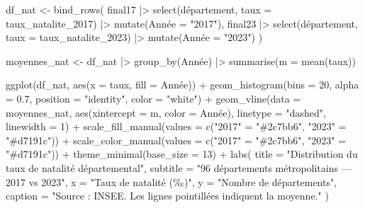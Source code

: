 \documentclass[
  letterpaper,
  DIV=11,
  numbers=noendperiod]{scrartcl}
\newenvironment{Shaded}{\begin{snugshade}}{\end{snugshade}}
\newcommand{\AttributeTok}[1]{\textcolor[rgb]{0.40,0.45,0.13}{#1}}
\newcommand{\DecValTok}[1]{\textcolor[rgb]{0.68,0.00,0.00}{#1}}
\newcommand{\FloatTok}[1]{\textcolor[rgb]{0.68,0.00,0.00}{#1}}
\newcommand{\FunctionTok}[1]{\textcolor[rgb]{0.28,0.35,0.67}{#1}}
\newcommand{\NormalTok}[1]{\textcolor[rgb]{0.00,0.23,0.31}{#1}}
\newcommand{\OtherTok}[1]{\textcolor[rgb]{0.00,0.23,0.31}{#1}}
\newcommand{\SpecialCharTok}[1]{\textcolor[rgb]{0.37,0.37,0.37}{#1}}
\newcommand{\StringTok}[1]{\textcolor[rgb]{0.13,0.47,0.30}{#1}}
\begin{document}
\begin{Shaded}
\begin{Highlighting}[]
\NormalTok{df\_nat }\OtherTok{\textless{}{-}} \FunctionTok{bind\_rows}\NormalTok{(}
\NormalTok{  final17 }\SpecialCharTok{|\textgreater{}} \FunctionTok{select}\NormalTok{(département, }\AttributeTok{taux =}\NormalTok{ taux\_natalite\_2017) }\SpecialCharTok{|\textgreater{}} \FunctionTok{mutate}\NormalTok{(Année }\OtherTok{=} \StringTok{"2017"}\NormalTok{),}
\NormalTok{  final23 }\SpecialCharTok{|\textgreater{}} \FunctionTok{select}\NormalTok{(département, }\AttributeTok{taux =}\NormalTok{ taux\_natalite\_2023) }\SpecialCharTok{|\textgreater{}} \FunctionTok{mutate}\NormalTok{(Année }\OtherTok{=} \StringTok{"2023"}\NormalTok{)}
\NormalTok{)}

\NormalTok{moyennes\_nat }\OtherTok{\textless{}{-}}\NormalTok{ df\_nat }\SpecialCharTok{|\textgreater{}} \FunctionTok{group\_by}\NormalTok{(Année) }\SpecialCharTok{|\textgreater{}} \FunctionTok{summarise}\NormalTok{(}\AttributeTok{m =} \FunctionTok{mean}\NormalTok{(taux))}

\FunctionTok{ggplot}\NormalTok{(df\_nat, }\FunctionTok{aes}\NormalTok{(}\AttributeTok{x =}\NormalTok{ taux, }\AttributeTok{fill =}\NormalTok{ Année)) }\SpecialCharTok{+}
  \FunctionTok{geom\_histogram}\NormalTok{(}\AttributeTok{bins =} \DecValTok{20}\NormalTok{, }\AttributeTok{alpha =} \FloatTok{0.7}\NormalTok{, }\AttributeTok{position =} \StringTok{"identity"}\NormalTok{, }\AttributeTok{color =} \StringTok{"white"}\NormalTok{) }\SpecialCharTok{+}
  \FunctionTok{geom\_vline}\NormalTok{(}\AttributeTok{data =}\NormalTok{ moyennes\_nat, }\FunctionTok{aes}\NormalTok{(}\AttributeTok{xintercept =}\NormalTok{ m, }\AttributeTok{color =}\NormalTok{ Année),}
             \AttributeTok{linetype =} \StringTok{"dashed"}\NormalTok{, }\AttributeTok{linewidth =} \DecValTok{1}\NormalTok{) }\SpecialCharTok{+}
  \FunctionTok{scale\_fill\_manual}\NormalTok{(}\AttributeTok{values  =} \FunctionTok{c}\NormalTok{(}\StringTok{"2017"} \OtherTok{=} \StringTok{"\#2c7bb6"}\NormalTok{, }\StringTok{"2023"} \OtherTok{=} \StringTok{"\#d7191c"}\NormalTok{)) }\SpecialCharTok{+}
  \FunctionTok{scale\_color\_manual}\NormalTok{(}\AttributeTok{values =} \FunctionTok{c}\NormalTok{(}\StringTok{"2017"} \OtherTok{=} \StringTok{"\#2c7bb6"}\NormalTok{, }\StringTok{"2023"} \OtherTok{=} \StringTok{"\#d7191c"}\NormalTok{)) }\SpecialCharTok{+}
  \FunctionTok{theme\_minimal}\NormalTok{(}\AttributeTok{base\_size =} \DecValTok{13}\NormalTok{) }\SpecialCharTok{+}
  \FunctionTok{labs}\NormalTok{(}
    \AttributeTok{title    =} \StringTok{"Distribution du taux de natalité départemental"}\NormalTok{,}
    \AttributeTok{subtitle =} \StringTok{"96 départements métropolitains — 2017 vs 2023"}\NormalTok{,}
    \AttributeTok{x        =} \StringTok{"Taux de natalité (‰)"}\NormalTok{,}
    \AttributeTok{y        =} \StringTok{"Nombre de départements"}\NormalTok{,}
    \AttributeTok{caption  =} \StringTok{"Source : INSEE. Les lignes pointillées indiquent la moyenne."}
\NormalTok{  )}
\end{Highlighting}
\end{Shaded}
\end{document}

